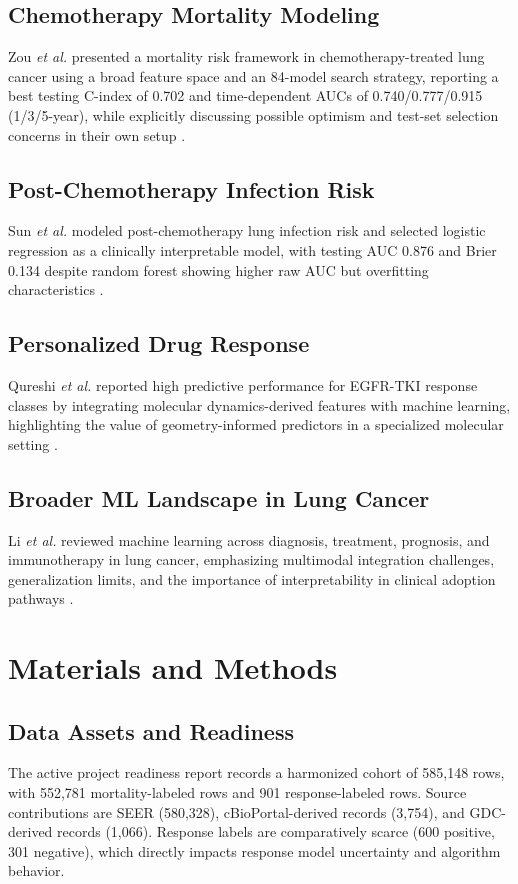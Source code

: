 \documentclass[journal]{IEEEtran}
\begin{document}
\subsection{Chemotherapy Mortality Modeling}
Zou \emph{et al.} presented a mortality risk framework in chemotherapy-treated lung cancer using a broad feature space and an 84-model search strategy, reporting a best testing C-index of 0.702 and time-dependent AUCs of 0.740/0.777/0.915 (1/3/5-year), while explicitly discussing possible optimism and test-set selection concerns in their own setup \cite{zou2025}.

\subsection{Post-Chemotherapy Infection Risk}
Sun \emph{et al.} modeled post-chemotherapy lung infection risk and selected logistic regression as a clinically interpretable model, with testing AUC 0.876 and Brier 0.134 despite random forest showing higher raw AUC but overfitting characteristics \cite{sun2024}.

\subsection{Personalized Drug Response}
Qureshi \emph{et al.} reported high predictive performance for EGFR-TKI response classes by integrating molecular dynamics-derived features with machine learning, highlighting the value of geometry-informed predictors in a specialized molecular setting \cite{qureshi2022}.

\subsection{Broader ML Landscape in Lung Cancer}
Li \emph{et al.} reviewed machine learning across diagnosis, treatment, prognosis, and immunotherapy in lung cancer, emphasizing multimodal integration challenges, generalization limits, and the importance of interpretability in clinical adoption pathways \cite{li2022review}.

\section{Materials and Methods}
\subsection{Data Assets and Readiness}
The active project readiness report records a harmonized cohort of 585,148 rows, with 552,781 mortality-labeled rows and 901 response-labeled rows. Source contributions are SEER (580,328), cBioPortal-derived records (3,754), and GDC-derived records (1,066). Response labels are comparatively scarce (600 positive, 301 negative), which directly impacts response model uncertainty and algorithm behavior.
\end{document}
